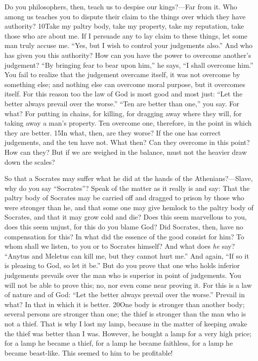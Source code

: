 Do you philosophers, then, teach us to despise our kings?—Far from it. Who among us teaches you to dispute their claim to the things over which they have authority? 10Take my paltry body, take my property, take my reputation, take those who are about me. If I persuade any to lay claim to these things, let some man truly accuse me. ``Yes, but I wish to control your judgements also.'' And who has given you this authority? How can you have the power to overcome another's judgement? ``By bringing fear to bear upon him,'' he says, ``I shall overcome him.'' You fail to realize that the judgement overcame itself, it was not overcome by something else; and nothing else can overcome moral purpose, but it overcomes itself. For this reason too the law of God is most good and most just: ``Let the better always prevail over the worse.'' ``Ten are better than one,'' you say. For what? For putting in chains, for killing, for dragging away where they will, for taking away a man's property. Ten overcome one, therefore, in the point in which they are better. 15In what, then, are they worse? If the one has correct judgements, and the ten have not. What then? Can they overcome in this point? How can they? But if we are weighed in the balance, must not the heavier draw down the scales?

So that a Socrates may suffer what he did at the hands of the Athenians?—Slave, why do you say ``Socrates''? Speak of the matter as it really is and say: That the paltry body of Socrates may be carried off and dragged to prison by those who were stronger than he, and that some one may give hemlock to the paltry body of Socrates, and that it may grow cold and die? Does this seem marvellous to you, does this seem unjust, for this do you blame God? Did Socrates, then, have no compensation for this? In what did the essence of the good consist for him? To whom shall we listen, to you or to Socrates himself? And what does \emph{he} say? ``Anytus and Meletus can kill me, but they cannot hurt me.'' And again, ``If so it is pleasing to God, so let it be.'' But do you prove that one who holds inferior judgements prevails over the man who is superior in point of judgements. You will not be able to prove this; no, nor even come near proving it. For this is a law of nature and of God: ``Let the better always prevail over the worse.'' Prevail in what? In that in which it is better. 20One body is stronger than another body; several persons are stronger than one; the thief is stronger than the man who is not a thief. That is why I lost my lamp, because in the matter of keeping awake the thief was better than I was. However, he bought a lamp for a very high price; for a lamp he became a thief, for a lamp he became faithless, for a lamp he became beast-like. This seemed to him to be profitable!

